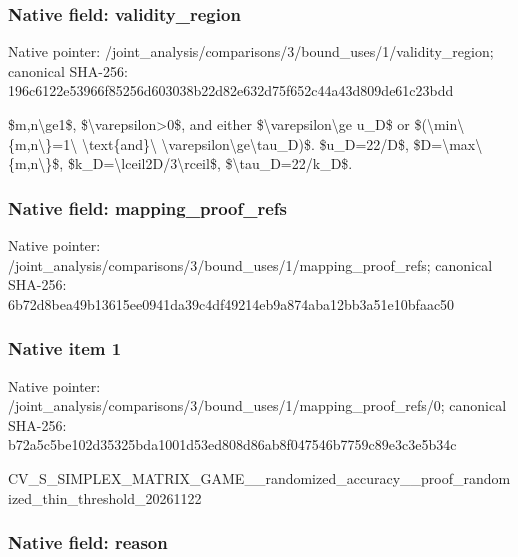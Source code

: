 \documentclass[10pt,a4paper]{article}
\begin{document}
\subsubsection{Native field: validity\_region}


Native pointer: /joint\_analysis/comparis\allowbreak{}ons/3/bound\_uses/1/valid\allowbreak{}ity\_region; canonical SHA-256: 196c6122e53966f85256d603\allowbreak{}038b22d82e632d75f652c44a\allowbreak{}43d809de61c23bdd


\$m,n\textbackslash{}ge1\$, \$\textbackslash{}varepsilon>0\$, and either \$\textbackslash{}varepsilon\textbackslash{}ge u\_D\$ or \$(\textbackslash{}min\textbackslash{}\{m,n\textbackslash{}\}=1\textbackslash{} \textbackslash{}text\{and\}\textbackslash{} \textbackslash{}varepsilon\textbackslash{}ge\textbackslash{}tau\_D)\$. \$u\_D=22/D\$, \$D=\textbackslash{}max\textbackslash{}\{m,n\textbackslash{}\}\$, \$k\_D=\textbackslash{}lceil2D/3\textbackslash{}rceil\$, \$\textbackslash{}tau\_D=22/k\_D\$.


\subsubsection{Native field: mapping\_proof\_refs}


Native pointer: /joint\_analysis/comparis\allowbreak{}ons/3/bound\_uses/1/mappi\allowbreak{}ng\_proof\_refs; canonical SHA-256: 6b72d8bea49b13615ee0941d\allowbreak{}a39c4df49214eb9a874aba12\allowbreak{}bb3a51e10bfaac50



\subsubsection{Native item 1}


Native pointer: /joint\_analysis/comparis\allowbreak{}ons/3/bound\_uses/1/mappi\allowbreak{}ng\_proof\_refs/0; canonical SHA-256: b72a5c5be102d35325bda100\allowbreak{}1d53ed808d86ab8f047546b7\allowbreak{}759c89e3c3e5b34c


CV\_S\_SIMPLEX\_MATRIX\_GAME\allowbreak{}\_\_randomized\_accuracy\_\_p\allowbreak{}roof\_randomized\_thin\_thr\allowbreak{}eshold\_20261122


\subsubsection{Native field: reason}
\end{document}

